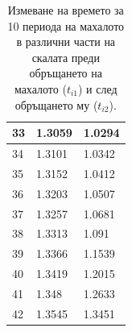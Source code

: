 \documentclass[12pt]{article}
\begin{document}
\begin{table}[h]
\begin{center}
\begin{tabular}{|l|l|l|}
33 &1.3059 &1.0294 \\\hline
34 &1.3101 &1.0342 \\\hline
35 &1.3152 &1.0412 \\\hline
36 &1.3203 &1.0507 \\\hline
37 &1.3257 &1.0681 \\\hline
38 &1.3313 &1.091 \\\hline
39 &1.3366 &1.1539 \\\hline
40 &1.3419 &1.2015 \\\hline
41 &1.348 &1.2633 \\\hline
42 &1.3545 &1.3451 \\\hline
\end{tabular}
\caption{\label{tbl:meas}Измеване на времето за 10 периода на махалото в различни части на скалата преди обръщането на махалото ($t_{i1}$) и след обръщането му ($t_{i2}$).}
\end{center}
\end{table}
\end{document}
